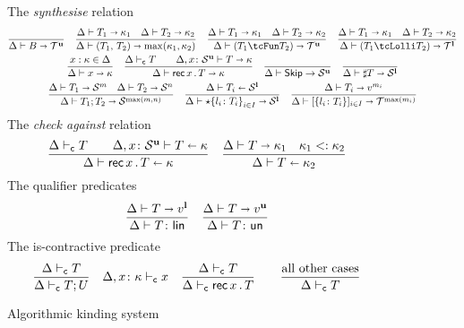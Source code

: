 \begin{figure}[h!]
  The \emph{synthesise} relation \hfill{}
  \begin{gather*}
    \frac{}{\algkindout{\tcBase}{\kindt^\Un}}
    \quad 
    \frac{
      \algkindout{T_1}{\kind_1}
      \quad
      \algkindout{T_2}{\kind_2}
    }{
      \algkindout{\tPair{T_1}{T_2}}{\max(\kind_1, \kind_2)}
    }
    \quad
    \frac{
      \algkindout{T_1}{\kind_1}
      \quad
      \algkindout{T_2}{\kind_2}
    }{
      \algkindout{(\tUnFun{T_1}{T_2})}{\kindt^\Un}
    }
    \quad
    \frac{
      \algkindout{T_1}{\kind_1}
      \quad
      \algkindout{T_2}{\kind_2}
    }{
      \algkindout{(\tLinFun{T_1}{T_2})}{\kindt^\Lin}
    }
    \\
    \frac{x : \kind \in \kindEnv}{\algkindout x \kind}
   \quad
  \frac{
    \contractive T
    \qquad
    \algkindout[\kindEnv, x\colon \kinds^\Un] T \kind
  }{
    \algkindout{\tRec xT}{\kind}
  }
  \quad
  \frac{}{\kindEnv \Alg \tskip \rightarrow \kinds^\Un}
  \quad 
  \frac{}{\algkindout{\tMsg T}{\kinds^\Lin}}
  \\
  \frac{
    \algkindout{T_1}{\kinds^m}
    \quad
    \algkindout{T_2}{\kinds^n}
  }{
    \algkindout{\tSemi{T_1}{T_2}}{\kinds^{\max(m,n)}}
  }
  \quad
  \frac{
    \algkindin{T_i}{\kinds^\Lin}
  }{
    \algkindout{\tChoice{\{l_i\colon T_i\}}_{i\in I}}{\kinds^\Lin}
  }
  \quad
  \frac{
    \algkindout{T_i}{v^{m_i}}
  }{
    \algkindout{\tData{\{l_i\colon T_i\}}_{i\in I}}{\kindt^{\max(m_i)}}
  }
  \end{gather*}
  The \emph{check against} relation\hfill{}
  \begin{equation*}
    \frac{
      \contractive T
      \qquad
      \algkindin[\kindEnv, x\colon \kinds^\Un] T \kind
    }{
      \algkindin{\tRec xT}{\kind}
    }
    \quad
    \frac{
      \algkindout{T}{\kind_1}
      \quad
      \subkind{\kind_1}{\kind_2}
    }{
      \algkindin T {\kind_2}
    }
  \end{equation*}
  The qualifier predicates \hfill{}\quad{}
  \begin{equation*}
    \frac{
      \algkindout T {v^\Lin}
    }{
      \isLin T
    }
    \quad
    \frac{
      \algkindout T {v^\Un}
    }{
      \isUn T
    }
  \end{equation*}
  The is-contractive predicate \hfill{}
  \begin{equation*}
    \frac{
      \contractive{T}
    }{
      \contractive{T;U}
    }
    \quad
    \contractive[\kindEnv,x\colon\kind]{x}
    \quad 
    \frac{
      \contractive{T}
    }{
      \contractive{\tRecK xT}
    }
    \qquad
    \frac{\text{all other cases}}{\contractive{T}}
  \end{equation*}
  \caption{Algorithmic kinding system}
  \label{fig:kinding-system}
\end{figure}

